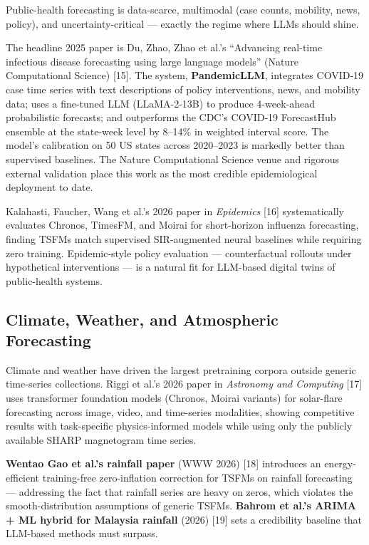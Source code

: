 Public-health forecasting is data-scarce, multimodal (case counts, mobility, news, policy), and uncertainty-critical --- exactly the regime where LLMs should shine.

The headline 2025 paper is Du, Zhao, Zhao et al.'s ``Advancing real-time infectious disease forecasting using large language models'' (Nature Computational Science) {[}15{]}. The system, \textbf{PandemicLLM}, integrates COVID-19 case time series with text descriptions of policy interventions, news, and mobility data; uses a fine-tuned LLM (LLaMA-2-13B) to produce 4-week-ahead probabilistic forecasts; and outperforms the CDC's COVID-19 ForecastHub ensemble at the state-week level by 8--14\% in weighted interval score. The model's calibration on 50 US states across 2020--2023 is markedly better than supervised baselines. The Nature Computational Science venue and rigorous external validation place this work as the most credible epidemiological deployment to date.

Kalahasti, Faucher, Wang et al.'s 2026 paper in \emph{Epidemics} {[}16{]} systematically evaluates Chronos, TimesFM, and Moirai for short-horizon influenza forecasting, finding TSFMs match supervised SIR-augmented neural baselines while requiring zero training. Epidemic-style policy evaluation --- counterfactual rollouts under hypothetical interventions --- is a natural fit for LLM-based digital twins of public-health systems.

\subsection{Climate, Weather, and Atmospheric Forecasting}\label{climate-weather-and-atmospheric-forecasting}

Climate and weather have driven the largest pretraining corpora outside generic time-series collections. Riggi et al.'s 2026 paper in \emph{Astronomy and Computing} {[}17{]} uses transformer foundation models (Chronos, Moirai variants) for solar-flare forecasting across image, video, and time-series modalities, showing competitive results with task-specific physics-informed models while using only the publicly available SHARP magnetogram time series.

\textbf{Wentao Gao et al.'s rainfall paper} (WWW 2026) {[}18{]} introduces an energy-efficient training-free zero-inflation correction for TSFMs on rainfall forecasting --- addressing the fact that rainfall series are heavy on zeros, which violates the smooth-distribution assumptions of generic TSFMs. \textbf{Bahrom et al.'s ARIMA + ML hybrid for Malaysia rainfall} (2026) {[}19{]} sets a credibility baseline that LLM-based methods must surpass.

